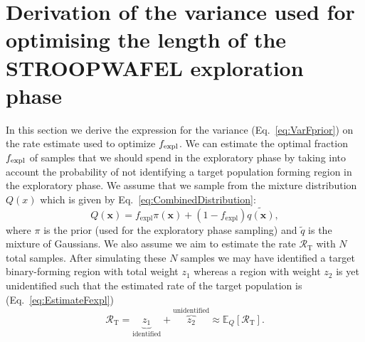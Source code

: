 \documentclass[a4paper,fleqn,usenatbib,useAMS,usedcolumn]{mnras}
\newcommand\rate{\mathcal{R}}
\newcommand{\AISs}{\textsc{STROOPWAFEL}}
\begin{document}









\appendix


\section{Derivation of the variance used for optimising the length of the \AISs{} exploration phase}
\label{app:Fprior}
In this section we derive the expression for the variance (Eq.~\ref{eq:VarFprior}) on the rate estimate used to optimize $f_{\rm{expl}}$. 
We can estimate the optimal fraction $f_{\rm{expl}}$ of samples that we should spend in the exploratory phase by taking into account the probability of not identifying a target population forming region in the exploratory phase. We assume that we sample from the mixture distribution $Q(x)$ which is given by Eq.~\ref{eq:CombinedDistribution}:
%
\begin{equation}
	Q(\boldsymbol{x}) =  f_{\text{expl}}  \pi(\boldsymbol{x})  +  (1 - f_{\text{expl}}) \widetilde{q(\boldsymbol{x})}, 
\label{eq:CombinedDistributionApp}
\end{equation}
%
where $\pi$ is the prior (used for the exploratory phase sampling) and $\widetilde{q}$ is the mixture of Gaussians. 
We also assume we aim to estimate the rate $\rate_{\text{T}} $ with $N$ total samples.   After simulating these $N$ samples we may have identified a target binary-forming region with total weight $z_1$   whereas a region with weight $z_2$ is yet unidentified such that the estimated rate of the target population is (Eq.~\ref{eq:EstimateFexpl})%
%
\begin{equation}
	\rate_{\text{T}} =  \underbrace{z_1}_{\text{identified}} + \overbrace{z_2}^{\text{unidentified}} \approx {\mathbb{E}_Q[\rate_{\text{T}}]}. 	 %
	\label{eq:EstimateFexplApp}
\end{equation}
%
\end{document}
